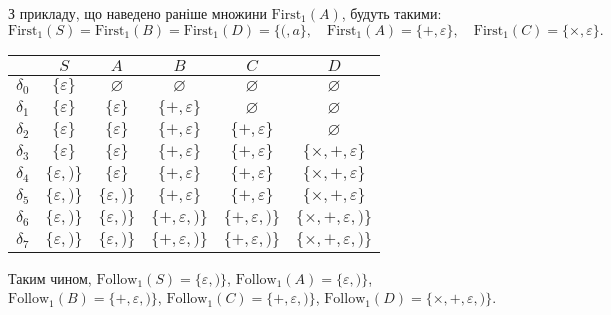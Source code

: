 З прикладу, що наведено раніше множини $\text{First}_1(A)$, будуть такими:
\[\text{First}_1 (S) = \text{First}_1 (B) = \text{First}_1 (D) = \{(, a\}, \quad \text{First}_1 (A) = \{+, \varepsilon\}, \quad \text{First}_1 (C) = \{\times, \varepsilon\}.\]

\begin{table}[H]
	\centering
	\begin{tabular}{|c|c|c|c|c|c|}
		\hline
		& $S$ & $A$ & $B$ & $C$ & $D$ \\ \hline
		$\delta_0$ & $\{\varepsilon\}$ & $\varnothing$ & $\varnothing$ & $\varnothing$ & $\varnothing$ \\ \hline
		$\delta_1$ & $\{\varepsilon\}$ & $\{\varepsilon\}$ & $\{+,\varepsilon\}$ & $\varnothing$ & $\varnothing$ \\ \hline
		$\delta_2$ & $\{\varepsilon\}$ & $\{\varepsilon\}$ & $\{+,\varepsilon\}$ & $\{+,\varepsilon\}$ & $\varnothing$ \\ \hline
		$\delta_3$ & $\{\varepsilon\}$ & $\{\varepsilon\}$ & $\{+,\varepsilon\}$ & $\{+,\varepsilon\}$ & $\{\times,+,\varepsilon\}$ \\ \hline
		$\delta_4$ & $\{\varepsilon,)\}$ & $\{\varepsilon\}$ & $\{+,\varepsilon\}$ & $\{+,\varepsilon\}$ & $\{\times,+,\varepsilon\}$ \\ \hline
		$\delta_5$ & $\{\varepsilon,)\}$ & $\{\varepsilon,)\}$ & $\{+,\varepsilon\}$ & $\{+,\varepsilon\}$ & $\{\times,+,\varepsilon\}$ \\ \hline
		$\delta_6$ & $\{\varepsilon,)\}$ & $\{\varepsilon,)\}$ & $\{+,\varepsilon,)\}$ & $\{+,\varepsilon,)\}$ & $\{\times,+,\varepsilon,)\}$ \\ \hline
		$\delta_7$ & $\{\varepsilon,)\}$ & $\{\varepsilon,)\}$ & $\{+,\varepsilon,)\}$ & $\{+,\varepsilon,)\}$ & $\{\times,+,\varepsilon,)\}$ \\ \hline
	\end{tabular}
\end{table}

Таким чином, $\text{Follow}_1 (S) = \{\varepsilon, )\}$, $\text{Follow}_1 (A) = \{\varepsilon, )\}$, $\text{Follow}_1 (B) = \{+,\varepsilon, )\}$, $\text{Follow}_1 (C) = \{+,\varepsilon, )\}$, $\text{Follow}_1 (D) = \{\times,+,\varepsilon, )\}$.

